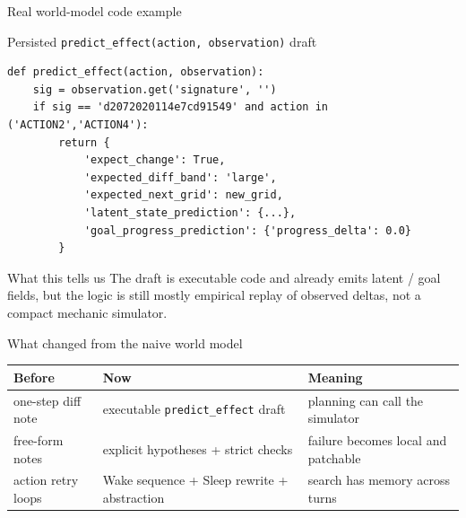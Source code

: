 \documentclass[aspectratio=169]{beamer}
\begin{document}
\begin{frame}[fragile]{Real world-model code example}
\scriptsize
\begin{block}{Persisted \texttt{predict\_effect(action, observation)} draft}
\begin{verbatim}
def predict_effect(action, observation):
    sig = observation.get('signature', '')
    if sig == 'd2072020114e7cd91549' and action in ('ACTION2','ACTION4'):
        return {
            'expect_change': True,
            'expected_diff_band': 'large',
            'expected_next_grid': new_grid,
            'latent_state_prediction': {...},
            'goal_progress_prediction': {'progress_delta': 0.0}
        }
\end{verbatim}
\end{block}

\begin{block}{What this tells us}
The draft is executable code and already emits latent / goal fields, but the logic is still mostly empirical replay of observed deltas, not a compact mechanic simulator.
\end{block}
\end{frame}

\begin{frame}{What changed from the naive world model}
\small
\centering
\begin{tabular}{p{} p{} p{}}
\toprule
\textbf{Before} & \textbf{Now} & \textbf{Meaning} \\
\midrule
one-step diff note & executable \texttt{predict\_effect} draft & planning can call the simulator \\
free-form notes & explicit hypotheses + strict checks & failure becomes local and patchable \\
action retry loops & Wake sequence + Sleep rewrite + abstraction & search has memory across turns \\
\bottomrule
\end{tabular}
\end{frame}
\end{document}
